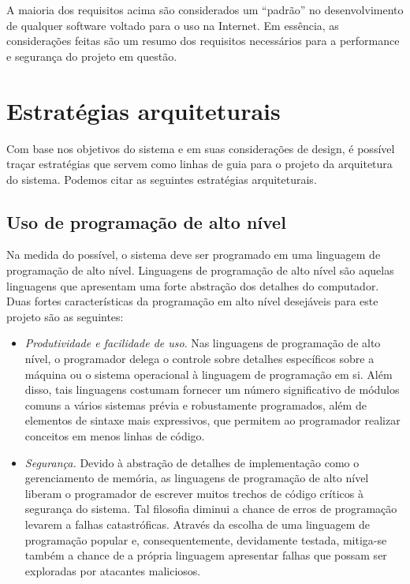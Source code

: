 \documentclass[ruledheader, 12pt]{abnt}
\begin{document}
A maioria dos requisitos acima são considerados um ``padrão'' no desenvolvimento de qualquer software voltado para o uso na Internet. Em essência, as considerações feitas são um resumo dos requisitos necessários para a performance e segurança do projeto em questão.

\section{Estratégias arquiteturais}

Com base nos objetivos do sistema e em suas considerações de design, é possível traçar estratégias que servem como linhas de guia para o projeto da arquitetura do sistema. Podemos citar as seguintes estratégias arquiteturais.

\subsection{Uso de programação de alto nível}

Na medida do possível, o sistema deve ser programado em uma linguagem de programação de alto nível. Linguagens de programação de alto nível são aquelas linguagens que apresentam uma forte abstração dos detalhes do computador. Duas fortes características da programação em alto nível desejáveis para este projeto são as seguintes:
\begin{itemize}
	\item \emph{Produtividade e facilidade de uso}. Nas linguagens de programação de alto nível, o programador delega o controle sobre detalhes específicos sobre a máquina ou o sistema operacional à linguagem de programação em si. Além disso, tais linguagens costumam fornecer um número significativo de módulos comuns a vários sistemas prévia e robustamente programados, além de elementos de sintaxe mais expressivos, que permitem ao programador realizar conceitos em menos linhas de código.
	
	\item \emph{Segurança.} Devido à abstração de detalhes de implementação como o gerenciamento de memória, as linguagens de programação de alto nível liberam o programador de escrever muitos trechos de código críticos à segurança do sistema. Tal filosofia diminui a chance de erros de programação levarem a falhas catastróficas. Através da escolha de uma linguagem de programação popular e, consequentemente, devidamente testada, mitiga-se também a chance de a própria linguagem apresentar falhas que possam ser exploradas por atacantes maliciosos.
\end{itemize}
\end{document}
